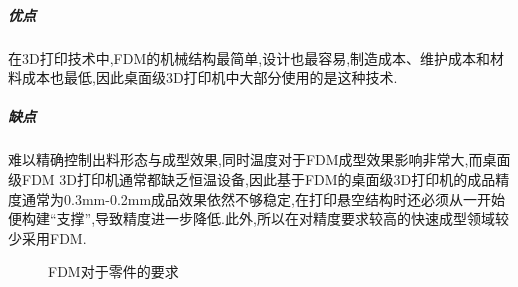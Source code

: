 \documentclass[a4paper,12pt,onecolumn,twoside]{article}
\begin{document}
\subparagraph{优点}
在3D打印技术中,FDM的机械结构最简单,设计也最容易,制造成本、维护成本和材料成本也最低,因此桌面级3D打印机中大部分使用的是这种技术.
\subparagraph{缺点}
难以精确控制出料形态与成型效果,同时温度对于FDM成型效果影响非常大,而桌面级FDM 3D打印机通常都缺乏恒温设备,因此基于FDM的桌面级3D打印机的成品精度通常为0.3mm-0.2mm成品效果依然不够稳定,在打印悬空结构时还必须从一开始便构建“支撑”,导致精度进一步降低.此外,所以在对精度要求较高的快速成型领域较少采用FDM.
\begin{figure}[ht]
\centering
{}
\caption{FDM对于零件的要求}
\end{figure}
\\
\end{document}
